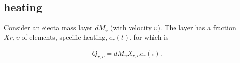 %
%
%
%
%
%

\subsection{\rproc{} heating}

Consider an ejecta mass layer $dM_{\upsilon}$ (with velocity $\upsilon$).
The layer has a fraction $X{r,\upsilon}$ of \rproc{} elements, specific heating, $\dot{e}_r(t)$,  for which is 

\begin{equation}
\dot{Q}_{r,\upsilon} = dM_{\upsilon}X_{r,\upsilon}\dot{e}_{r}(t).
\end{equation}

